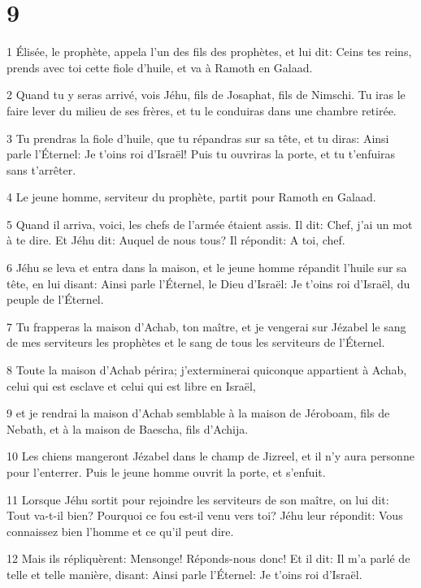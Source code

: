 \chapter{9}

\par 1 Élisée, le prophète, appela l'un des fils des prophètes, et lui dit: Ceins tes reins, prends avec toi cette fiole d'huile, et va à Ramoth en Galaad.
\par 2 Quand tu y seras arrivé, vois Jéhu, fils de Josaphat, fils de Nimschi. Tu iras le faire lever du milieu de ses frères, et tu le conduiras dans une chambre retirée.
\par 3 Tu prendras la fiole d'huile, que tu répandras sur sa tête, et tu diras: Ainsi parle l'Éternel: Je t'oins roi d'Israël! Puis tu ouvriras la porte, et tu t'enfuiras sans t'arrêter.
\par 4 Le jeune homme, serviteur du prophète, partit pour Ramoth en Galaad.
\par 5 Quand il arriva, voici, les chefs de l'armée étaient assis. Il dit: Chef, j'ai un mot à te dire. Et Jéhu dit: Auquel de nous tous? Il répondit: A toi, chef.
\par 6 Jéhu se leva et entra dans la maison, et le jeune homme répandit l'huile sur sa tête, en lui disant: Ainsi parle l'Éternel, le Dieu d'Israël: Je t'oins roi d'Israël, du peuple de l'Éternel.
\par 7 Tu frapperas la maison d'Achab, ton maître, et je vengerai sur Jézabel le sang de mes serviteurs les prophètes et le sang de tous les serviteurs de l'Éternel.
\par 8 Toute la maison d'Achab périra; j'exterminerai quiconque appartient à Achab, celui qui est esclave et celui qui est libre en Israël,
\par 9 et je rendrai la maison d'Achab semblable à la maison de Jéroboam, fils de Nebath, et à la maison de Baescha, fils d'Achija.
\par 10 Les chiens mangeront Jézabel dans le champ de Jizreel, et il n'y aura personne pour l'enterrer. Puis le jeune homme ouvrit la porte, et s'enfuit.
\par 11 Lorsque Jéhu sortit pour rejoindre les serviteurs de son maître, on lui dit: Tout va-t-il bien? Pourquoi ce fou est-il venu vers toi? Jéhu leur répondit: Vous connaissez bien l'homme et ce qu'il peut dire.
\par 12 Mais ils répliquèrent: Mensonge! Réponds-nous donc! Et il dit: Il m'a parlé de telle et telle manière, disant: Ainsi parle l'Éternel: Je t'oins roi d'Israël.
